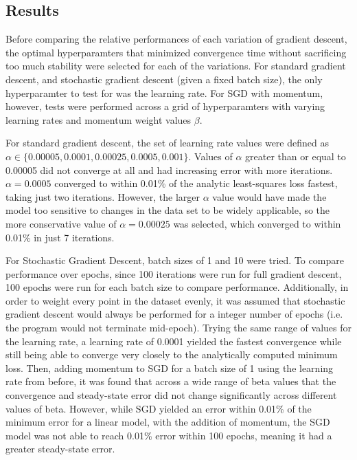 \documentclass{article}
\begin{document}
\subsection{Results}
Before comparing the relative performances of each variation of gradient descent, the optimal hyperparamters that minimized convergence time without sacrificing too much stability were selected for each of the variations. For standard gradient descent, and stochastic gradient descent (given a fixed batch size), the only hyperparamter to test for was the learning rate. For SGD with momentum, however, tests were performed across a grid of hyperparamters with varying learning rates and momentum weight values $\beta$.

For standard gradient descent, the set of learning rate values were defined as $\alpha \in \{0.00005, 0.0001, 0.00025, 0.0005, 0.001\}$. Values of $\alpha$ greater than or equal to 0.00005 did not converge at all and had increasing error with more iterations. $\alpha = 0.0005$ converged to within 0.01\% of the analytic least-squares loss fastest, taking just two iterations. However, the larger $\alpha$ value would have made the model too sensitive to changes in the data set to be widely applicable, so the more conservative value of $\alpha = 0.00025$ was selected, which converged to within 0.01\% in just 7 iterations.

For Stochastic Gradient Descent, batch sizes of 1 and 10 were tried. To compare performance over epochs, since 100 iterations were run for full gradient descent, 100 epochs were run for each batch size to compare performance. Additionally, in order to weight every point in the dataset evenly, it was assumed that stochastic gradient descent would always be performed for a integer number of epochs (i.e. the program would not terminate mid-epoch). Trying the same range of values for the learning rate, a learning rate of 0.0001 yielded the fastest convergence while still being able to converge very closely to the analytically computed minimum loss. Then, adding momentum to SGD for a batch size of 1 using the learning rate from before, it was found that across a wide range of beta values that the convergence and steady-state error did not change significantly across different values of beta. However, while SGD yielded an error within 0.01\% of the minimum error for a linear model, with the addition of momentum, the SGD model was not able to reach 0.01\% error within 100 epochs, meaning it had a greater steady-state error.
\end{document}

